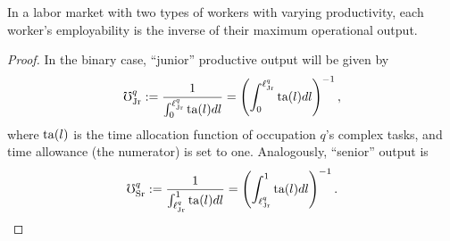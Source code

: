 \documentclass[hidelinks, nonatbib]{elsarticle}
\begin{document}
\begin{theorem}
    \label{bet}
    In a labor market with two types of workers with varying productivity, each worker's employability is the inverse of their maximum operational output.
    \begin{proof}
        In the binary case, ``junior'' productive output will be given by
        \begin{gather}
            \mho_{\text{Jr}}^{q}
            :=
            \frac{
                1
            }{
                \int_{0}^{\ell_{\text{Jr}}^{q}}
                \text{ta}(l)
                dl
            }
            = 
            \left(
                \int_{0}^{\ell_{\text{Jr}}^{q}}
                    \text{ta}(l)
                    dl
            \right) ^ {-1}
            ,
        \end{gather}
        where $\text{ta}(l)$ is the time allocation function of occupation $q$'s complex tasks, and time allowance (the numerator) is set to one. Analogously, ``senior'' output is
        \begin{gather}
            \mho_{\text{Sr}}^{q}
            :=
            \frac{
                1
            }{
                \int_{\ell_{\text{Jr}}^{q}}^{1}
                \text{ta}(l)
                dl
            }
            = 
            \left(
                \int_{\ell_{\text{Jr}}^{q}}^{1}
                    \text{ta}(l)
                    dl
            \right) ^ {-1}
            .
        \end{gather}


\end{proof}
\end{theorem}
\end{document}
